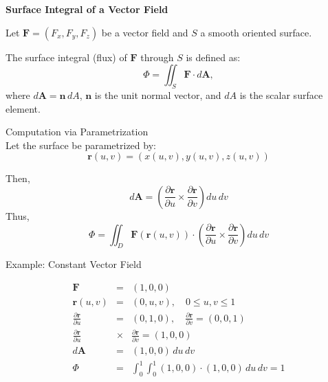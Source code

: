 \documentclass[a4paper,12pt]{letter}
\begin{document}
\begin{center}
\textbf{\huge Surface Integral of a Vector Field}
\end{center}

Let $\mathbf{F} = (F_x, F_y, F_z)$ be a vector field and $S$ a smooth oriented surface.

The surface integral (flux) of $\mathbf{F}$ through $S$ is defined as:
$$ \Phi = \iint_S \mathbf{F} \cdot d\mathbf{A}, $$
where $d\mathbf{A} = \mathbf{n}\, dA$, $\mathbf{n}$ is the unit normal vector, and $dA$ is the scalar surface element.

Computation via Parametrization \\ Let the surface be parametrized by:
  $$ \mathbf{r}(u,v) = (x(u,v), y(u,v), z(u,v)) $$

Then,
$$ d\mathbf{A} = \left( \frac{\partial \mathbf{r}}{\partial u} \times \frac{\partial \mathbf{r}}{\partial v} \right) du\,dv $$
Thus,
$$ \Phi = \iint_D \mathbf{F}(\mathbf{r}(u,v)) \cdot 
\left( \frac{\partial \mathbf{r}}{\partial u} \times \frac{\partial \mathbf{r}}{\partial v} \right) du\,dv$$

Example: Constant Vector Field

\begin{center}
\end{center}

\begin{eqnarray*}
\mathbf{F} &=& (1,0,0) \\
\mathbf{r}(u,v) &=& (0,u,v), \quad 0 \le u,v \le 1 \\
\frac{\partial \mathbf{r}}{\partial u} &=& (0,1,0), \quad
\frac{\partial \mathbf{r}}{\partial v} = (0,0,1) \\
\frac{\partial \mathbf{r}}{\partial u} &\times& 
\frac{\partial \mathbf{r}}{\partial v} = (1,0,0)\\
d\mathbf{A} &=& (1,0,0)\, du\,dv \\
\Phi &=& \int_0^1 \int_0^1 (1,0,0)\cdot(1,0,0)\, du\,dv = 1
\end{eqnarray*}
\end{document}
